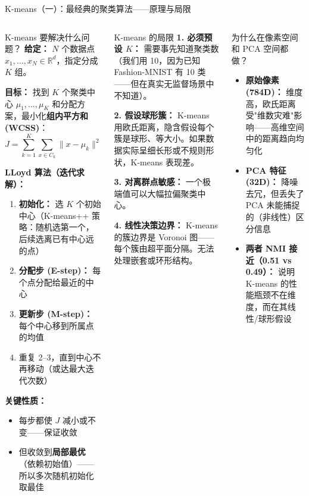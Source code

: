 \documentclass[aspectratio=169]{ctexbeamer}
\begin{document}
\begin{frame}[shrink=15]{K-means（一）：最经典的聚类算法——原理与局限}
\small

\begin{columns}[T]
\begin{block}{K-means 要解决什么问题？}
\footnotesize
\textbf{给定：} $N$ 个数据点 $x_1, \dots, x_N \in \mathbb{R}^d$，指定分成 $K$ 组。

\textbf{目标：} 找到 $K$ 个聚类中心 $\mu_1, \dots, \mu_K$ 和分配方案，最小化\textbf{组内平方和 (WCSS)}：
\[
J = \sum_{k=1}^K \sum_{x \in C_k} \|x - \mu_k\|^2
\]

\textbf{LLoyd 算法（迭代求解）：}
\begin{enumerate}
  \item \textbf{初始化：} 选 $K$ 个初始中心（K-means++ 策略：随机选第一个，后续选离已有中心远的点）
  \item \textbf{分配步 (E-step)：} 每个点分配给最近的中心
  \item \textbf{更新步 (M-step)：} 每个中心移到所属点的均值
  \item 重复 2--3，直到中心不再移动（或达最大迭代次数）
\end{enumerate}

\textbf{关键性质：}
\begin{itemize}
  \item 每步都使 $J$ 减小或不变——保证收敛
  \item 但收敛到\textbf{局部最优}（依赖初始值）——所以多次随机初始化取最佳
\end{itemize}
\end{block}

\begin{block}{K-means 的局限}
\footnotesize
\textbf{1. 必须预设 $K$：} 需要事先知道聚类数（我们用 10，因为已知 Fashion-MNIST 有 10 类——但在真实无监督场景中不知道）。

\textbf{2. 假设球形簇：} K-means 用欧氏距离，隐含假设每个簇是球形、等大小。如果数据实际呈细长形或不规则形状，K-means 表现差。

\textbf{3. 对离群点敏感：} 一个极端值可以大幅拉偏聚类中心。

\textbf{4. 线性决策边界：} K-means 的簇边界是 Voronoi 图——每个簇由超平面分隔。无法处理嵌套或环形结构。
\end{block}

\vspace{0.1cm}

\begin{block}{为什么在像素空间和 PCA 空间都做？}
\footnotesize
\begin{itemize}
  \item \textbf{原始像素 (784D)：} 维度高，欧氏距离受"维数灾难"影响——高维空间中的距离趋向均匀化
  \item \textbf{PCA 特征 (32D)：} 降噪去冗，但丢失了 PCA 未能捕捉的（非线性）区分信息
  \item \textbf{两者 NMI 接近（0.51 vs 0.49）：} 说明 K-means 的性能瓶颈不在维度，而在其线性/球形假设
\end{itemize}
\end{block}
\end{columns}
\end{frame}
\end{document}

